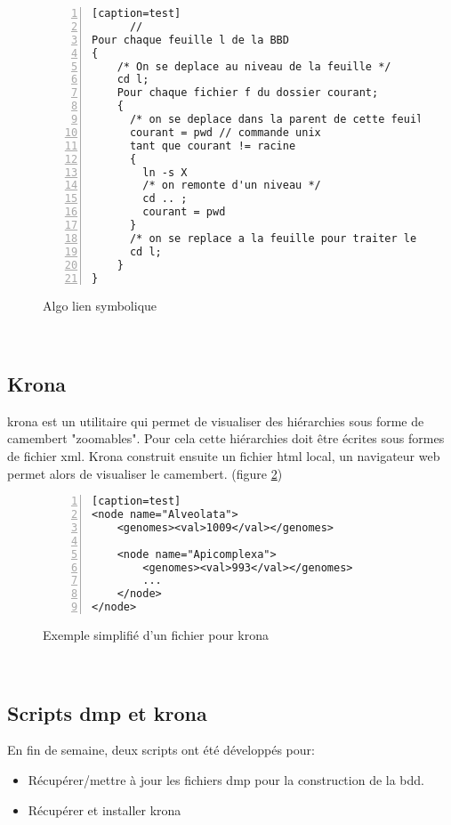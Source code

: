 \begin{figure}[H]
  

\begin{lstlisting}[numbers=left][caption=test]
      //
Pour chaque feuille l de la BBD
{
    /* On se deplace au niveau de la feuille */
    cd l;
    Pour chaque fichier f du dossier courant;
    {
      /* on se deplace dans la parent de cette feuille */  
      courant = pwd // commande unix
      tant que courant != racine
      {
        ln -s X
        /* on remonte d'un niveau */
        cd .. ;
        courant = pwd
      }
      /* on se replace a la feuille pour traiter le nouveau fichier */
      cd l;
    }
}                                            
\end{lstlisting}
\caption{\label{linkage} Algo lien symbolique}
\end{figure}
~\\

\subsection{Krona}
  krona est un utilitaire qui permet de visualiser des hiérarchies sous forme de camembert "zoomables". Pour cela cette hiérarchies doit être écrites sous formes de fichier xml. Krona construit ensuite un fichier html local, un navigateur web permet alors de visualiser le camembert. (figure \ref{krona})
  
  \begin{figure}[H]
\begin{lstlisting}[numbers=left][caption=test]
<node name="Alveolata">
    <genomes><val>1009</val></genomes>
    
    <node name="Apicomplexa">
        <genomes><val>993</val></genomes>
        ...
    </node>      
</node>                                          
\end{lstlisting}
\caption{\label{krona}Exemple simplifié d'un fichier pour krona}
\end{figure}
~\\

\subsection{Scripts dmp et krona}
  En fin de semaine, deux scripts ont été développés pour: 
  \begin{itemize}
    \item Récupérer/mettre à jour les fichiers dmp pour la construction de la bdd.
    \item Récupérer et installer krona
  \end{itemize}
